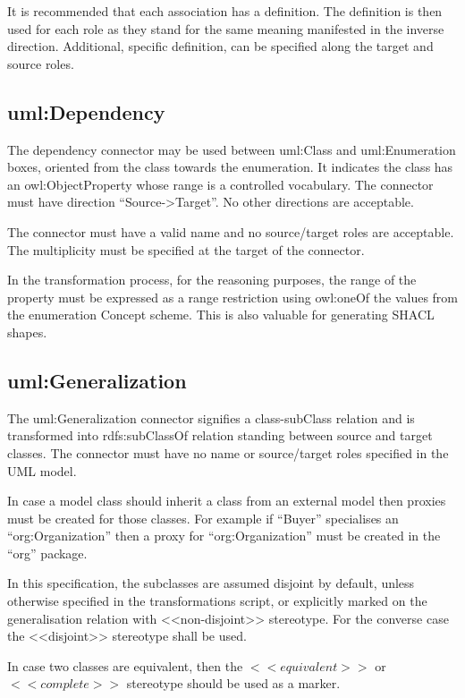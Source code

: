 	It is recommended that each association has a definition. The definition is then used for each role as they stand for the same meaning manifested in the inverse direction. Additional, specific definition, can be specified along the target and source roles. 
	
	
	\subsection{uml:Dependency}
	\label{sec:dependency}
	
	The dependency connector may be used between uml:Class and uml:Enumeration boxes, oriented from the class towards the enumeration. It indicates the class has an owl:ObjectProperty whose range is a controlled vocabulary. 
	The connector must have direction ``Source->Target''. No other directions are acceptable. 
	
	The connector must have a valid name and no source/target roles are acceptable. The multiplicity must be specified at the target of the connector. 
	
	In the transformation process, for the reasoning purposes, the range of the property must be expressed as a range restriction using owl:oneOf the values from the enumeration Concept scheme. This is also valuable for generating SHACL shapes.
		
	\subsection{uml:Generalization}
	\label{sec:degenalization}
	
	The uml:Generalization connector signifies a class-subClass relation and is transformed into rdfs:subClassOf relation standing between source and target classes. The connector must have no name or source/target roles specified in the UML model.
	
	In case a model class should inherit a class from an external model then proxies must be created for those classes. For example if ``Buyer'' specialises an ``org:Organization'' then a proxy for ``org:Organization'' must be created in the ``org'' package. 
	
	In this specification, the subclasses are assumed disjoint by default, unless otherwise specified in the transformations script, or explicitly marked on the generalisation relation with <<non-disjoint>> stereotype. For the converse case the <<disjoint>> stereotype shall be used.
	 
	In case two classes are equivalent, then the $<<equivalent>>$ or $<<complete>>$ stereotype should be used as a marker. 
	
	